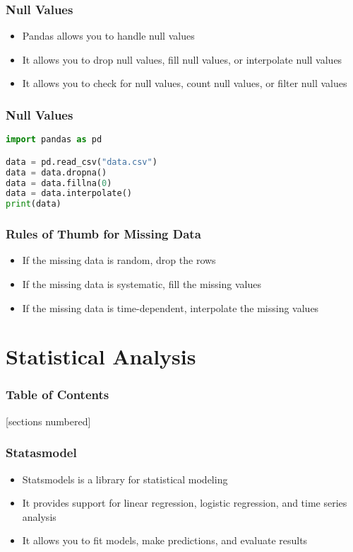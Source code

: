 \documentclass[serif, 9pt, aspectratio=32]{beamer}
\begin{document}
\begin{frame}
    \centering
    \frametitle{Null Values}
    \begin{itemize}
        \setlength{\itemsep}{2em}
        \item Pandas allows you to handle null values
        \item It allows you to drop null values, fill null values, or interpolate null values
        \item It allows you to check for null values, count null values, or filter null values
    \end{itemize}
\end{frame}

\begin{frame}[fragile]
    \frametitle{Null Values}
    \begin{lstlisting}[language=Python]
import pandas as pd

data = pd.read_csv("data.csv")
data = data.dropna()
data = data.fillna(0)
data = data.interpolate()
print(data)
    \end{lstlisting}
\end{frame}

\begin{frame}
    \centering
    \frametitle{Rules of Thumb for Missing Data}
    \begin{itemize}
        \setlength{\itemsep}{2em}
        \item If the missing data is random, drop the rows
        \item If the missing data is systematic, fill the missing values
        \item If the missing data is time-dependent, interpolate the missing values
    \end{itemize}
\end{frame}

\section{Statistical Analysis}

\begin{frame}
    \frametitle{Table of Contents}
    [sections numbered]
    \tableofcontents[currentsection]
\end{frame}

\begin{frame}
    \centering
    \frametitle{Statasmodel}
    \begin{itemize}
        \setlength{\itemsep}{2em}
        \item Statsmodels is a library for statistical modeling
        \item It provides support for linear regression, logistic regression, and time series analysis
        \item It allows you to fit models, make predictions, and evaluate results
    \end{itemize}
\end{frame}
\end{document}
